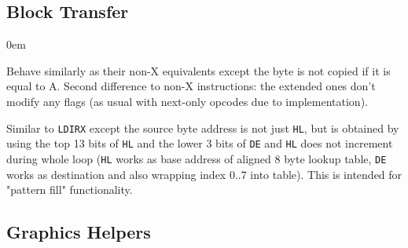 \documentclass[twoside,openright,a4paper]{book}
\begin{document}
\subsection{Block Transfer}

\begin{basedescript}{
	\desclabelstyle{\multilinelabel}
	\desclabelwidth{3cm}}
	\itemsep0em


	Behave similarly as their non-X equivalents except the byte is not copied if it is equal to A. Second difference to non-X instructions: the extended ones don't modify any flags (as usual with next-only opcodes due to implementation).\\


	Similar to {\tt LDIRX} except the source byte address is not just {\tt HL}, but is obtained by using the top 13 bits of {\tt HL} and the lower 3 bits of {\tt DE} and {\tt HL} does not increment during whole loop ({\tt HL} works as base address of aligned 8 byte lookup table, {\tt DE} works as destination and also wrapping index 0..7 into table). This is intended for "pattern fill" functionality.
	
\end{basedescript}

\subsection{Graphics Helpers}
\end{document}
